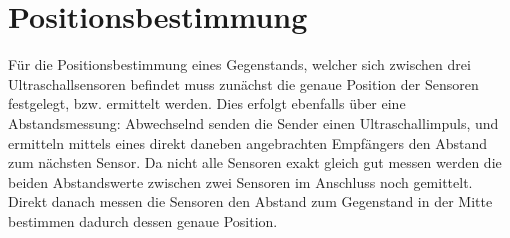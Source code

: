 \section{Positionsbestimmung}
Für die Positionsbestimmung eines Gegenstands, welcher sich zwischen drei Ultraschallsensoren befindet muss zunächst die genaue Position der Sensoren festgelegt, bzw. ermittelt werden. Dies erfolgt ebenfalls über eine Abstandsmessung: 
Abwechselnd senden die Sender einen Ultraschallimpuls, und ermitteln mittels eines direkt daneben angebrachten Empfängers den Abstand zum nächsten Sensor. Da nicht alle Sensoren exakt gleich gut messen werden die beiden Abstandswerte zwischen zwei Sensoren im Anschluss noch gemittelt. Direkt danach messen die Sensoren den Abstand zum Gegenstand in der Mitte bestimmen dadurch dessen genaue Position.

